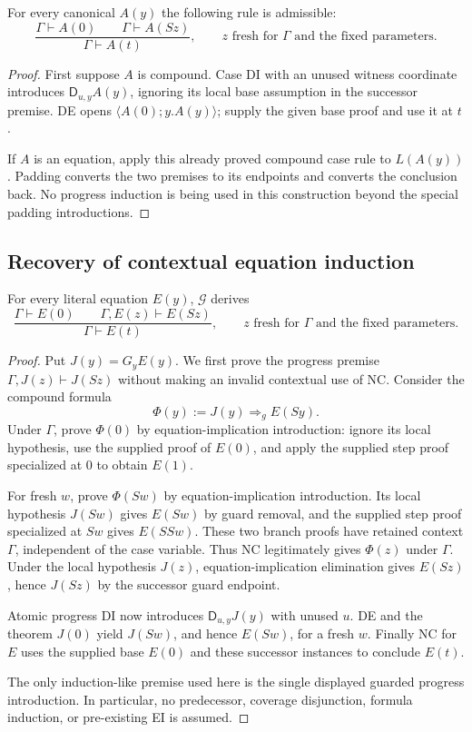 \begin{lemma}
For every canonical $A(y)$ the following rule is admissible:
\[
 \frac{\Gamma\vdash A(0)\qquad\Gamma\vdash A(Sz)}
      {\Gamma\vdash A(t)},
 \qquad z\text{ fresh for }\Gamma\text{ and the fixed parameters}.
 \tag{NC}\label{eq:guarded-cases}
\]
\end{lemma}
\begin{proof}
First suppose $A$ is compound.  Case DI with an unused witness coordinate
introduces $\mathsf D_{u,y}A(y)$, ignoring its local base assumption in
the successor premise.  DE opens $\langle A(0);y.A(y)\rangle$; supply
the given base proof and use it at $t$.

If $A$ is an equation, apply this already proved compound case rule to
$L(A(y))$.  Padding converts the two premises to its endpoints and
converts the conclusion back.  No progress induction is being used in
this construction beyond the special padding introductions.
\end{proof}

\subsection{Recovery of contextual equation induction}

\begin{theorem}
For every literal equation $E(y)$, $\mathcal G$ derives
\[
 \frac{\Gamma\vdash E(0)\qquad\Gamma,E(z)\vdash E(Sz)}
      {\Gamma\vdash E(t)},
 \qquad z\text{ fresh for }\Gamma\text{ and the fixed parameters}.
 \tag{EI}\label{eq:guarded-ei}
\]
\end{theorem}
\begin{proof}
Put $J(y)=G_yE(y)$.  We first prove the progress premise
$\Gamma,J(z)\vdash J(Sz)$ without making an invalid contextual use of
NC.  Consider the compound formula
\[
 \Phi(y):=J(y)\Rightarrow_g E(Sy).
\]
Under $\Gamma$, prove $\Phi(0)$ by equation-implication introduction:
ignore its local hypothesis, use the supplied proof of $E(0)$, and
apply the supplied step proof specialized at $0$ to obtain $E(1)$.

For fresh $w$, prove $\Phi(Sw)$ by equation-implication introduction.
Its local hypothesis $J(Sw)$ gives $E(Sw)$ by guard removal, and the
supplied step proof specialized at $Sw$ gives $E(SSw)$.
These two branch proofs have retained context $\Gamma$, independent
of the case variable.  Thus NC legitimately gives $\Phi(z)$ under
$\Gamma$.  Under the local hypothesis $J(z)$, equation-implication
elimination gives $E(Sz)$, hence $J(Sz)$ by the successor guard endpoint.

Atomic progress DI now introduces $\mathsf D_{u,y}J(y)$ with unused
$u$.  DE and the theorem $J(0)$ yield $J(Sw)$, and hence $E(Sw)$, for
a fresh $w$.  Finally NC for $E$ uses the supplied base $E(0)$ and
these successor instances to conclude $E(t)$.

The only induction-like premise used here is the single displayed
guarded progress introduction.  In particular, no predecessor,
coverage disjunction, formula induction, or pre-existing EI is assumed.
\end{proof}

